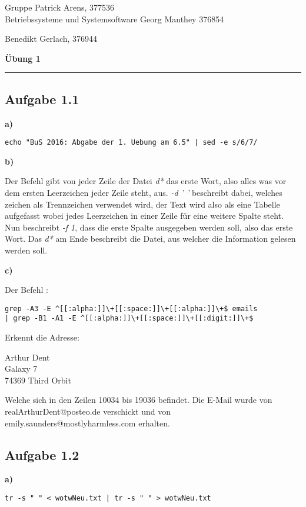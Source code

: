 \documentclass[a4paper,graphics,11pt]{article}
\newcommand{\aufgabe}[1]{\subsection*{Aufgabe #1}}
\begin{document}
\noindent Gruppe              \hfill Patrick Arens, 377536\\
\noindent Betriebssysteme und Systemsoftware    \hfill Georg Manthey 376854\\
\strut\hfill Benedikt Gerlach, 376944\\
\begin{center}
	\LARGE{\textbf{Übung 1}}
\end{center}
\begin{center}
\rule[0.1ex]{\textwidth}{1pt}
\end{center}

\aufgabe{1.1}
\textbf{a)}

\begin{verbatim}
echo "BuS 2016: Abgabe der 1. Uebung am 6.5" | sed -e s/6/7/
\end{verbatim}

\textbf{b)}

Der Befehl gibt von jeder Zeile der Datei \textit{d*} das erste Wort, also alles was vor dem ersten Leerzeichen jeder Zeile steht, aus. \textit{-d ' '} beschreibt dabei, welches zeichen als Trennzeichen verwendet wird, der Text wird also als eine Tabelle aufgefasst wobei jedes Leerzeichen in einer Zeile für eine weitere Spalte steht. Nun beschreibt \textit{-f 1}, dass die erste Spalte ausgegeben werden soll, also das erste Wort. Das \textit{d*} am Ende beschreibt die Datei, aus welcher die Information gelesen werden soll.


\textbf{c)}

Der Befehl :

\begin{verbatim}
grep -A3 -E ^[[:alpha:]]\+[[:space:]]\+[[:alpha:]]\+$ emails 
| grep -B1 -A1 -E ^[[:alpha:]]\+[[:space:]]\+[[:digit:]]\+$
\end{verbatim}



Erkennt die Adresse:

Arthur Dent\\
Galaxy 7\\
74369 Third Orbit

Welche sich in den Zeilen 10034 bis 19036 befindet. Die E-Mail wurde von realArthurDent@posteo.de verschickt und von emily.saunders@mostlyharmless.com erhalten.\\

\newpage

\aufgabe{1.2}
\textbf{a)}

\begin{verbatim}
tr -s " " < wotwNeu.txt | tr -s " " > wotwNeu.txt
\end{verbatim}
\end{document}
